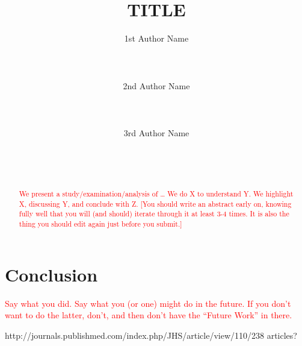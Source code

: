\documentclass{sigchi}
\begin{document}
\title{TITLE}

\author{
  \alignauthor 1st Author Name\\
    \\
    \\
    \\
  \alignauthor 2nd Author Name\\
    \\
    \\
    \\
  \alignauthor 3rd Author Name\\
    \\
    \\
    \\
}

\maketitle

\begin{abstract}
\textcolor{red}{We present a study/examination/analysis of … 
We do X to understand Y. 
We highlight X, discussing Y, and conclude with Z.
[You should write an abstract early on, knowing fully well that you will (and should) iterate through it at least 3-4 times. It is also the thing you should edit again just before you submit.]
}
\end{abstract}










\section{Conclusion}
\textcolor{red}{Say what you did. Say what you (or one) might do in the future. If you don’t want to do the latter, don’t, and then don’t have the “Future Work” in there. }

\balance



http://journals.publishmed.com/index.php/JHS/article/view/110/238
articles?
\end{document}
